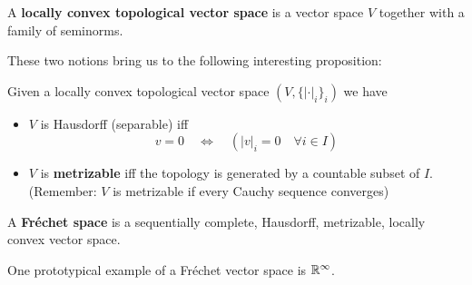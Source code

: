 \begin{definition}
\label{def:Locally_convex}
  A \textbf{locally convex topological vector space} is a vector space $V$ together with a family of seminorms.
\end{definition}

These two notions bring us to the following interesting proposition:

\begin{prop}
  Given a locally convex topological vector space $(V, \{|\cdot |_i\}_i )$ we have
  \begin{itemize}
    \item $V$ is Hausdorff (separable) iff
    $$ v = 0 \quad \Leftrightarrow \quad \left( |v|_i = 0 \quad \forall i \in I\right)$$
    \item $V$ is \textbf{metrizable} iff the topology is generated by a countable subset of $I$. (Remember: $V$ is metrizable if every Cauchy sequence converges)
  \end{itemize}
\end{prop}

\begin{definition}
  A \textbf{Fréchet space} is a sequentially complete, Hausdorff, metrizable, locally convex vector space.
\end{definition}

One prototypical example of a Fréchet vector space is $\mathbb{R}^\infty$.


\newpage
